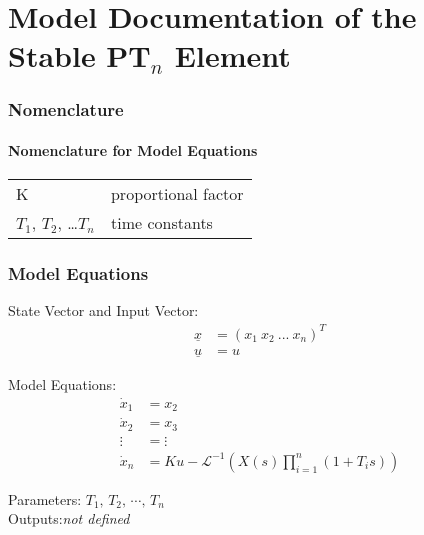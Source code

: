 \documentclass[10pt,a4paper]{article}
\begin{document}
	\part*{Model Documentation of the \\ Stable PT$_n$ Element} %
	
	
	\section{Nomenclature} %
	\subsection{Nomenclature for Model Equations} %
	
	\begin{tabular}{ll}
		K & proportional factor \\
		$T_1$, $T_2$, \dots $T_n$ & time constants
	\end{tabular}
	
	
	
	\section{Model Equations} %
	
	State Vector and Input Vector:
	\begin{align*}
		\underline{x} &= (x_1 \ x_2 \ ... \ x_n)^T \\
		\underline{u} &= u
	\end{align*}

	\noindent Model Equations:		
	\begin{subequations}
	\begin{align}
		\dot{x}_1 &= x_2 \\    
		\dot{x}_2 &= x_3 \\
		\vdots &= \vdots \\
		\dot{x}_n &= Ku - \mathscr{L}^{-1}(X(s) \prod_{i = 1}^{n}(1 + T_i s))
	\end{align}
	\end{subequations}

	
	\noindent
	Parameters: $T_1, \, T_2, \, \cdots, \, T_n$ %
	\\
	Outputs:\textit{\textlangle not defined\textrangle}
	
\end{document}
